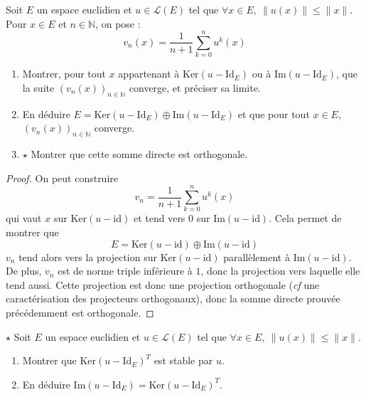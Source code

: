 \documentclass[french,a4paper]{article}
\newcommand{\N}{\mathbb{N}}
\renewcommand{\ker}{\text{Ker}}
\theoremstyle{plain}
\theoremstyle{definition}
\theoremstyle{remark}
\begin{document}
\begin{ex}{}
	Soit $E$ un espace euclidien et $u\in\mathcal{L}(E)$ tel que $\forall x\in E,\ \lVert u(x)\rVert\leqslant\lVert x\rVert$. Pour $x\in E$ et $n\in\N$, on pose : $$v_n(x)=\frac{1}{n+1}\sum_{k=0}^{n}u^k(x)$$
	\begin{enumerate}
		\item Montrer, pour tout $x$ appartenant à $\ker(u-\text{Id}_E)$ ou à $\text{Im}(u-\text{Id}_E)$, que la suite $(v_n(x))_{n\in\N}$ converge, et préciser sa limite.
		\item En déduire $E=\ker(u-\text{Id}_E)\oplus \text{Im}(u-\text{Id}_E)$ et que pour tout $x\in E$, $(v_n(x))_{n\in\N}$ converge.
		\item $\star$ Montrer que cette somme directe est orthogonale.
	\end{enumerate}
\end{ex}
\begin{proof}
	On peut construire $$v_n=\frac{1}{n+1}\sum_{k=0}^{n}u^k(x)$$ qui vaut $x$ sur $\text{Ker}(u-\text{id})$ et tend vers 0 sur $\text{Im}(u-\text{id})$. Cela permet de montrer que $$E=\text{Ker}(u-\text{id})\oplus\text{Im}(u-\text{id})$$ $v_n$ tend alors vers la projection sur $\text{Ker}(u-\text{id})$ parallèlement à $\text{Im}(u-\text{id})$. De plus, $v_n$ est de norme triple inférieure à $1$, donc la projection vers laquelle elle tend aussi. Cette projection est donc une projection orthogonale (\textit{cf} une caractérisation des projecteurs orthogonaux), donc la somme directe prouvée précédemment est orthogonale.
\end{proof}

\begin{ex}{$\star$}
	Soit $E$ un espace euclidien et $u\in\mathcal{L}(E)$ tel que $\forall x\in E,\ \lVert u(x)\rVert\leqslant\lVert x\rVert$.
	\begin{enumerate}
		\item Montrer que $\ker(u-\text{Id}_E)^T$ est stable par $u$.
		\item En déduire $\text{Im}(u-\text{Id}_E)=\ker(u-\text{Id}_E)^T$.
	\end{enumerate}
\end{ex}
\end{document}
